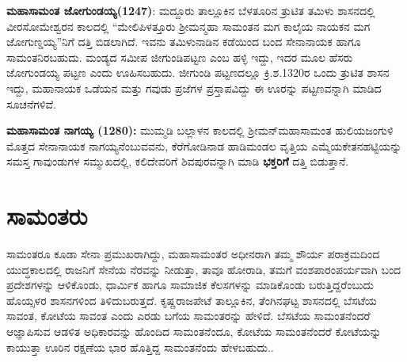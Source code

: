 \textbf{ಮಹಾಸಾಮಂತ ಜೋಗುಂಡಯ್ಯ(1247)}: ಮದ್ದೂರು ತಾಲ್ಲೂಕಿನ ಬೆಳತೂರಿನ ತ್ರುಟಿತ ತಮಿಳು ಶಾಸನದಲ್ಲಿ ವೀರಸೋಮೇಶ್ವರನ ಕಾಲದಲ್ಲಿ “ಮೇಲಿಪಿಳತ್ತೂರು ಶ‍್ರೀಮನ್ಮಹಾ ಸಾಮಂತನ ಮಗ ಕಾಲೈಯ ನಾಯಕನ ಮಗ \hbox{ಜೋಗುಣ್ಡಯ್ಯ”}\-ನಿಗೆ ದತ್ತಿ ಬಿಡಲಾಗಿದೆ. ಇವನು ತಮಿಳುನಾಡಿನ ಕಡೆಯಿಂದ ಬಂದ ಸೇನಾನಾಯಕ ಹಾಗೂ ಸಾಮಂತನಿರಬಹುದು. ಮಂಡ್ಯದ ಸಮೀಪ ಜೀಗುಂಡಿಪಟ್ಟಣ ಎಂಬ ಹಳ್ಳಿ ಇದ್ದು, ಇದರ ಮೂಲ ಹೆಸರು ಜೋಗುಂಡಯ್ಯ ಪಟ್ಟಣ ಎಂದು ಊಹಿಸಬಹುದು. ಜೀಗುಂಡಿ ಪಟ್ಟಣದಲ್ಲೂ ಕ್ರಿ.ಶ.1320ರ ಒಂದು ತ್ರುಟಿತ ಶಾಸನ ಇದ್ದು, ಮಹಾನಾಯಕ ಒಡೆಯನ ಮತ್ತು ಗವುಡು ಪ್ರಜೆಗಳ ಪ್ರಸ್ತಾಪವಿದ್ದು ಈ ಊರನ್ನು ಪಟ್ಟಣವನ್ನಾಗಿ ಮಾಡಿದ ಸೂಚನೆಗಳಿವೆ.

\textbf{ಮಹಾಸಾಮಂತ ನಾಗಯ್ಯ (1280):} ಮುಮ್ಮಡಿ ಬಲ್ಲಾಳನ ಕಾಲದಲ್ಲಿ ಶ‍್ರೀಮನ್​ ಮಹಾಸಾಮಂತ ಹುಲಿಯಜಂಗುಳಿ ಮೊತ್ತದ ಸೇನಾನಾಯಕ ನಾಗಯ್ಯನೆಂಬುವವನು, ಕೆರೆಗೋಡಿನಾಡ ಹಾಡಿಮಂಡಲ ವೃತ್ತಿಯ ಎಮ್ಮೆಯಕೇತನಹಟ್ಟಿಯನ್ನು ಸಮಸ್ತ ಗಾವುಂಡುಗಳ ಸಮ್ಮುಖದಲ್ಲಿ, ಕಲಿದೇವರಿಗೆ ಶಿವಪುರವನ್ನಾಗಿ ಮಾಡಿ \textbf{ಭಕ್ತರಿಗೆ }ದತ್ತಿ ಬಿಡುತ್ತಾನೆ.


\section{ಸಾಮಂತರು}

ಸಾಮಂತರೂ ಕೂಡಾ ಸೇನಾ ಪ್ರಮುಖರಾಗಿದ್ದು, ಮಹಾಸಾಮಂತರ ಅಧೀನರಾಗಿ ತಮ್ಮ ಶೌರ್ಯ ಪರಾಕ್ರಮದಿಂದ ಯುದ್ಧಕಾಲದಲ್ಲಿ ರಾಜನಿಗೆ ಸೇನೆಯ ನೆರವನ್ನು ನೀಡುತ್ತಾ, ತಾವೂ ಹೋರಾಡಿ, ತಮಗೆ ವಂಶಪಾರಂಪರ್ಯವಾಗಿ ಬಂದ ಪ್ರದೇಶಗಳನ್ನು ಆಳಿಕೊಂಡು, ಧಾರ್ಮಿಕ ಹಾಗೂ ಸಾಮಾಜಿಕ ಕೆಲಸಗಳನ್ನು ಮಾಡಿಕೊಂಡು ಬರುತ್ತಿದ್ದರೆಂಬುದು ಹೊಯ್ಸಳರ ಶಾಸನಗಳಿಂದ ತಿಳಿದುಬರುತ್ತದೆ. ಕೃಷ್ಣರಾಜಪೇಟೆ ತಾಲ್ಲೂಕಿನ, ತೆಂಗಿನಘಟ್ಟ ಶಾಸನದಲ್ಲಿ ಬೆಸಟೆಯ ಸಾವಂತ, ಕೋಟೆಯ ಸಾವಂತ ಎಂದು ಎರಡು ಬಗೆಯ ಸಾಮಂತರನ್ನು ಹೇಳಿದೆ. ಬೆಸಟೆಯ ಸಾಮಂತನೆಂದರೆ ಆಜ್ಞಾಪಿಸುವ ಆಡಳಿತ ಅಧಿಕಾರವನ್ನು ಹೊಂದಿದ ಸಾಮಂತನೆಂದೂ, ಕೋಟೆಯ ಸಾಮಂತನೆಂದರೆ ಕೋಟೆಯನ್ನು ಕಾಯುತ್ತಾ ಊರಿನ ರಕ್ಷಣೆಯ ಭಾರ ಹೊತ್ತಿದ್ದ ಸಾಮಂತನೆಂದು ಹೇಳಬಹುದು..


